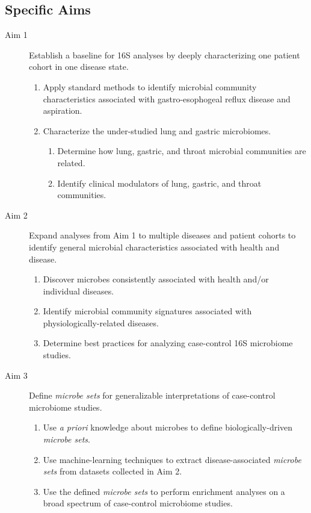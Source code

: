 \documentclass[12pt]{article}
\begin{document}
\subsection{Specific Aims}
\begin{description}
	\item[Aim 1] Establish a baseline for 16S analyses by deeply characterizing one patient cohort in one disease state.
		\begin{enumerate}
			\item  Apply standard methods to identify microbial community characteristics associated with gastro-esophogeal reflux disease and aspiration.
			\item Characterize the under-studied lung and gastric microbiomes.
			\begin{enumerate}
			\item Determine how lung, gastric, and throat microbial communities are related.
			\item Identify clinical modulators of lung, gastric, and throat communities.
			\end{enumerate}
		\end{enumerate}
	\item[Aim 2] Expand analyses from Aim 1 to multiple diseases and patient cohorts to identify general microbial characteristics associated with health and disease.
	\begin{enumerate}
		\item Discover microbes consistently associated with health and/or individual diseases.
		\item Identify microbial community signatures associated with physiologically-related diseases.
		\item Determine best practices for analyzing case-control 16S microbiome studies.
	\end{enumerate}
	\item[Aim 3] Define \textit{microbe sets} for generalizable interpretations of case-control microbiome studies.
	\begin{enumerate}
	\item Use \textit{a priori} knowledge about microbes to define biologically-driven \textit{microbe sets}.
	\item Use machine-learning techniques to extract disease-associated \textit{microbe sets} from datasets collected in Aim 2.
	\item Use the defined \textit{microbe sets} to perform enrichment analyses on a broad spectrum of case-control microbiome studies.
	\end{enumerate}
\end{description}
\newpage
\end{document}

